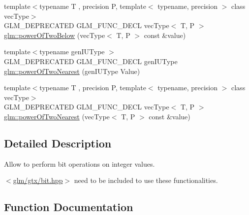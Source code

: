 \begin{DoxyCompactItemize}
\item 
{\footnotesize template$<$typename T , precision P, template$<$ typename, precision $>$ class vec\+Type$>$ }\\G\+L\+M\+\_\+\+D\+E\+P\+R\+E\+C\+A\+T\+E\+D G\+L\+M\+\_\+\+F\+U\+N\+C\+\_\+\+D\+E\+C\+L vec\+Type$<$ T, P $>$ \hyperlink{group__gtx__bit_gae33bb1ca2b55846b23a0f0796a679195}{glm\+::power\+Of\+Two\+Below} (vec\+Type$<$ T, P $>$ const \&value)
\item 
{\footnotesize template$<$typename gen\+I\+U\+Type $>$ }\\G\+L\+M\+\_\+\+D\+E\+P\+R\+E\+C\+A\+T\+E\+D G\+L\+M\+\_\+\+F\+U\+N\+C\+\_\+\+D\+E\+C\+L gen\+I\+U\+Type \hyperlink{group__gtx__bit_ga5f65973a5d2ea38c719e6a663149ead9}{glm\+::power\+Of\+Two\+Nearest} (gen\+I\+U\+Type Value)
\item 
{\footnotesize template$<$typename T , precision P, template$<$ typename, precision $>$ class vec\+Type$>$ }\\G\+L\+M\+\_\+\+D\+E\+P\+R\+E\+C\+A\+T\+E\+D G\+L\+M\+\_\+\+F\+U\+N\+C\+\_\+\+D\+E\+C\+L vec\+Type$<$ T, P $>$ \hyperlink{group__gtx__bit_ga2d7e85995d097518b8d70cd409bda39e}{glm\+::power\+Of\+Two\+Nearest} (vec\+Type$<$ T, P $>$ const \&value)
\end{DoxyCompactItemize}


\subsection{Detailed Description}
Allow to perform bit operations on integer values. 

$<$\hyperlink{bit_8hpp}{glm/gtx/bit.\+hpp}$>$ need to be included to use these functionalities. 

\subsection{Function Documentation}
\hypertarget{group__gtx__bit_ga0dcc8fe7c3d3ad60dea409281efa3d05}{}
